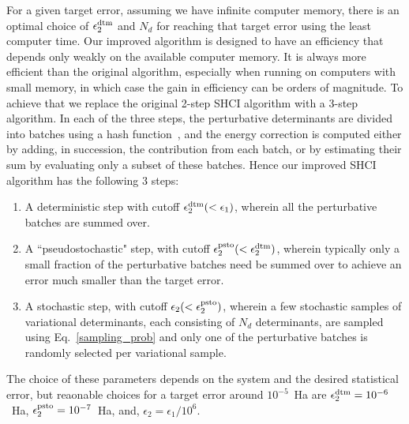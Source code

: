 \documentclass[%
preprint,
 superscriptaddress,
 amsmath,amssymb,
 aps,
]{revtex4-1}
\begin{document}
For a given target error, assuming we have infinite computer memory, there is an optimal choice of $\epsilon_2^{\rm dtm}$ and $N_d$
for reaching that target error using the least computer time.
Our improved algorithm is designed to have an efficiency that depends only weakly on the available computer memory.
It is always more efficient than the original algorithm, especially when running on computers with small memory, in which case the
gain in efficiency can be orders of magnitude.
To achieve that we replace the original 2-step SHCI algorithm with a 3-step algorithm.
In each of the three steps, the perturbative determinants are divided into batches using a hash function~\cite{Jen-Hash-97, Boost-2012},
and the energy correction is computed either by adding, in succession, the contribution from each batch,
or by estimating their sum by evaluating
only a subset of these batches.
Hence our improved SHCI algorithm has the following 3 steps:
\begin{enumerate}
\item A deterministic step with cutoff $\epsilon_2^{\rm dtm} (< \epsilon_1)$, wherein all the perturbative batches are summed over.
\item A ``pseudostochastic" step, with cutoff $\epsilon_2^{\rm psto} (< \epsilon_2^{\rm dtm})$, wherein typically only a small fraction of the perturbative batches
need be summed over to achieve an error much smaller than the target error.
\item A stochastic step, with cutoff $\epsilon_2 (<\epsilon_2^{\rm psto}) $, wherein a few stochastic samples of variational determinants,
each consisting of $N_d$ determinants, are sampled using Eq.~\ref{sampling_prob} and only one of the
perturbative batches is randomly selected per variational sample.
\end{enumerate}
The choice of these parameters depends on the system and the desired statistical error, but
reaonable choices for a target error around $10^{-5}$~Ha are
$\epsilon_2^{\rm dtm} = 10^{-6}$~Ha,
$\epsilon_2^{\rm psto} = 10^{-7}$~Ha, and,
$\epsilon_2 = \epsilon_{1}/10^6$.
\end{document}
